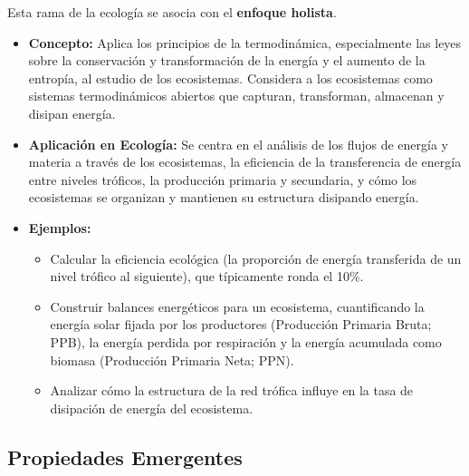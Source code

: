 \documentclass[
]{book}
\providecommand{\tightlist}{%
  \setlength{\itemsep}{0pt}\setlength{\parskip}{0pt}}
\begin{document}
Esta rama de la ecología se asocia con el \textbf{enfoque holista}.

\begin{itemize}
\tightlist
\item
  \textbf{Concepto:} Aplica los principios de la termodinámica, especialmente las leyes sobre la conservación y transformación de la energía y el aumento de la entropía, al estudio de los ecosistemas. Considera a los ecosistemas como sistemas termodinámicos abiertos que capturan, transforman, almacenan y disipan energía.
\item
  \textbf{Aplicación en Ecología:} Se centra en el análisis de los flujos de energía y materia a través de los ecosistemas, la eficiencia de la transferencia de energía entre niveles tróficos, la producción primaria y secundaria, y cómo los ecosistemas se organizan y mantienen su estructura disipando energía.
\item
  \textbf{Ejemplos:}

  \begin{itemize}
  \tightlist
  \item
    Calcular la eficiencia ecológica (la proporción de energía transferida de un nivel trófico al siguiente), que típicamente ronda el 10\%.
  \item
    Construir balances energéticos para un ecosistema, cuantificando la energía solar fijada por los productores (Producción Primaria Bruta; PPB), la energía perdida por respiración y la energía acumulada como biomasa (Producción Primaria Neta; PPN).
  \item
    Analizar cómo la estructura de la red trófica influye en la tasa de disipación de energía del ecosistema.
  \end{itemize}
\end{itemize}

\subsection*{\texorpdfstring{\textbf{Propiedades Emergentes}}{Propiedades Emergentes}}\label{emerg}
\end{document}
